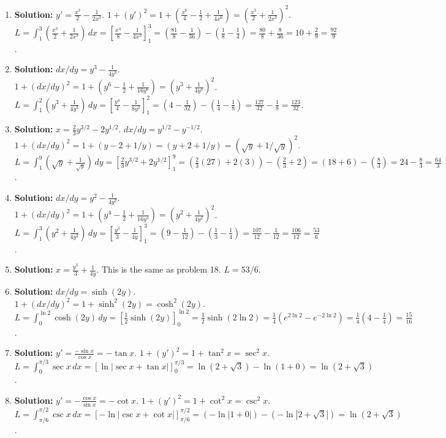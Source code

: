 \documentclass{article}
\begin{document}
\begin{enumerate}
    \item \textbf{Solution:} $y'=\frac{x^3}{2}-\frac{1}{2x^3}$. $1+(y')^2=1+(\frac{x^6}{4}-\frac{1}{2}+\frac{1}{4x^6})=(\frac{x^3}{2}+\frac{1}{2x^3})^2$.
    $L=\int_1^3 (\frac{x^3}{2}+\frac{1}{2x^3}) \,dx = [\frac{x^4}{8}-\frac{1}{4x^2}]_1^3 = (\frac{81}{8}-\frac{1}{36}) - (\frac{1}{8}-\frac{1}{4}) = \frac{80}{8} + \frac{8}{36} = 10 + \frac{2}{9} = \frac{92}{9}$.

    \item \textbf{Solution:} $dx/dy = y^3 - \frac{1}{4y^3}$. $1+(dx/dy)^2 = 1 + (y^6 - \frac{1}{2} + \frac{1}{16y^6}) = (y^3 + \frac{1}{4y^3})^2$.
    $L=\int_1^2 (y^3 + \frac{1}{4y^3}) \,dy = [\frac{y^4}{4} - \frac{1}{8y^2}]_1^2 = (4-\frac{1}{32}) - (\frac{1}{4}-\frac{1}{8}) = \frac{127}{32} - \frac{1}{8} = \frac{123}{32}$.
    
    \item \textbf{Solution:} $x=\frac{2}{3}y^{3/2} - 2y^{1/2}$. $dx/dy=y^{1/2}-y^{-1/2}$. $1+(dx/dy)^2 = 1+(y-2+1/y)=(y+2+1/y)=(\sqrt{y}+1/\sqrt{y})^2$.
    $L=\int_1^9 (\sqrt{y}+\frac{1}{\sqrt{y}}) \,dy = [\frac{2}{3}y^{3/2}+2y^{1/2}]_1^9 = (\frac{2}{3}(27)+2(3)) - (\frac{2}{3}+2) = (18+6)-(\frac{8}{3}) = 24-\frac{8}{3} = \frac{64}{3}$.
    
    \item \textbf{Solution:} $dx/dy=y^2-\frac{1}{4y^2}$. $1+(dx/dy)^2=1+(y^4-\frac{1}{2}+\frac{1}{16y^4})=(y^2+\frac{1}{4y^2})^2$.
    $L=\int_1^3 (y^2+\frac{1}{4y^2}) \,dy = [\frac{y^3}{3}-\frac{1}{4y}]_1^3 = (9-\frac{1}{12})-(\frac{1}{3}-\frac{1}{4}) = \frac{107}{12}-\frac{1}{12}=\frac{106}{12}=\frac{53}{6}$.
    
    \item \textbf{Solution:} $x=\frac{y^3}{3}+\frac{1}{4y}$. This is the same as problem 18. $L=53/6$.
    
    \item \textbf{Solution:} $dx/dy=\sinh(2y)$. $1+(dx/dy)^2 = 1+\sinh^2(2y)=\cosh^2(2y)$.
    $L=\int_0^{\ln 2} \cosh(2y) \,dy = [\frac{1}{2}\sinh(2y)]_0^{\ln 2} = \frac{1}{2}\sinh(2\ln 2) = \frac{1}{4}(e^{2\ln 2}-e^{-2\ln 2}) = \frac{1}{4}(4-\frac{1}{4}) = \frac{15}{16}$.
    
    \item \textbf{Solution:} $y' = \frac{-\sin x}{\cos x} = -\tan x$. $1+(y')^2=1+\tan^2x=\sec^2x$.
    $L=\int_0^{\pi/3} \sec x \,dx = [\ln|\sec x + \tan x|]_0^{\pi/3} = \ln(2+\sqrt{3}) - \ln(1+0) = \ln(2+\sqrt{3})$.
    
    \item \textbf{Solution:} $y'=-\frac{\cos x}{\sin x}=-\cot x$. $1+(y')^2=1+\cot^2x=\csc^2x$.
    $L=\int_{\pi/6}^{\pi/2} \csc x \,dx = [-\ln|\csc x + \cot x|]_{\pi/6}^{\pi/2} = (-\ln|1+0|) - (-\ln|2+\sqrt{3}|) = \ln(2+\sqrt{3})$.
    

\end{enumerate}
\end{document}

